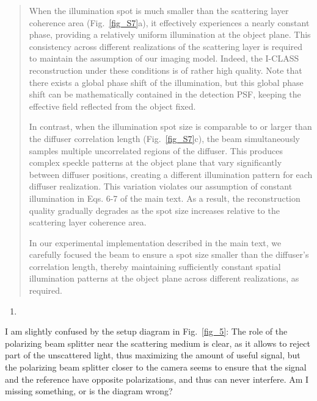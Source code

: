 \documentclass[12pt]{article}
\newenvironment{solved_reviewercomment}
    {\begin{tcolorbox}[width=\linewidth,colback=gray!5,colframe=solved_commentcolor!50,title=Reviewer Comment,left=5pt,right=5pt]}
    {\end{tcolorbox}}
\newenvironment{ourresponse}
    {\begin{tcolorbox}[width=\linewidth,breakable,enhanced,colback=gray!5,colframe=responsecolor!50,title=Response,left=5pt,right=5pt]}
    {\end{tcolorbox}}
\begin{document}
\begin{ourresponse}
\begin{quote}
When the illumination spot is much smaller than the scattering layer coherence area (Fig.~\ref{fig_S7}a), it effectively experiences a nearly constant phase, providing a relatively uniform illumination at the object plane. This consistency across different realizations of the scattering layer is required to maintain the assumption of our imaging model. Indeed, the I-CLASS reconstruction under these conditions is of rather high quality.
Note that there exists a global phase shift of the illumination, but this global phase shift can be mathematically contained in the detection PSF, keeping the effective field reflected from the object fixed.

In contrast, when the illumination spot size is comparable to or larger than the diffuser correlation length (Fig.~\ref{fig_S7}c), the beam simultaneously samples multiple uncorrelated regions of the diffuser. This produces complex speckle patterns at the object plane that vary significantly between diffuser positions, creating a different illumination pattern for each diffuser realization. This variation violates our assumption of constant illumination in Eqs. 6-7 of the main text. As a result, the reconstruction quality gradually degrades as the spot size increases relative to the scattering layer coherence area. 

In our experimental implementation described in the main text, we carefully focused the beam to ensure a spot size smaller than the diffuser's correlation length, thereby maintaining sufficiently constant spatial illumination patterns at the object plane across different realizations, as required.
\end{quote}

\end{ourresponse}

\begin{enumerate}[label=\arabic*., resume]
\item \leavevmode
\end{enumerate}
\vspace{-1em}
\begin{solved_reviewercomment}
    I am slightly confused by the setup diagram in Fig.~\ref{fig_5}: The role of the polarizing beam splitter near the scattering medium is clear, as it allows to reject part of the unscattered light, thus maximizing the amount of useful signal, but the polarizing beam splitter closer to the camera seems to ensure that the signal and the reference have opposite polarizations, and thus can never interfere. Am I missing something, or is the diagram wrong?
\end{solved_reviewercomment}
\end{document}
